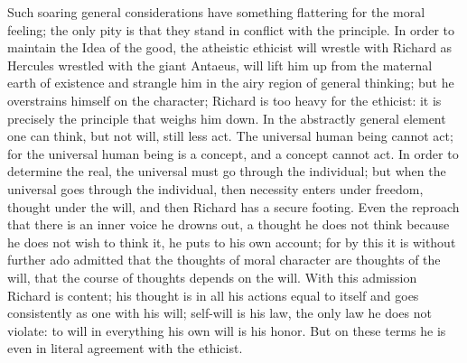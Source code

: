 \documentclass[12pt,a4paper,openany]{book}
\newcommand{\opage}[1]{\marginnote{\footnotesize\textit{[#1]}}}
\begin{document}
Such soaring general considerations have something
flattering for the moral feeling; the only pity is that they
stand in conflict with the principle. In order to maintain the Idea
of the good, the atheistic ethicist will wrestle with Richard as
Hercules wrestled with the giant Antaeus, will lift him up
from the maternal earth of existence and strangle him in the airy region of
general thinking; but he overstrains himself
on the character; Richard is too heavy for the ethicist: it is
precisely the principle that weighs him down. In the abstractly general element
one can think, but not will, still less
act. The universal human being cannot act; for the universal human being
is a concept, and a concept cannot act.
In order to determine the real, the universal must go
through the individual; but when the universal goes
through the individual, then necessity enters
under freedom, thought under the will, and then
Richard has a secure footing. Even the reproach
that there is an inner voice he drowns out, a thought
he does not think because he does not wish to think it, he
\setcounter{footnote}{0}%
\opage{541}puts to his own account; for by this it is without further ado admitted
that the thoughts of moral character are thoughts of the will,
that the course of thoughts depends on the will. With this admission
Richard is content; his thought is in all his
actions equal to itself and goes consistently as one with
his will; self-will is his law, the only law
he does not violate: to will in everything his own will is his
honor. But on these terms he is even in literal
agreement with the ethicist.
\end{document}
